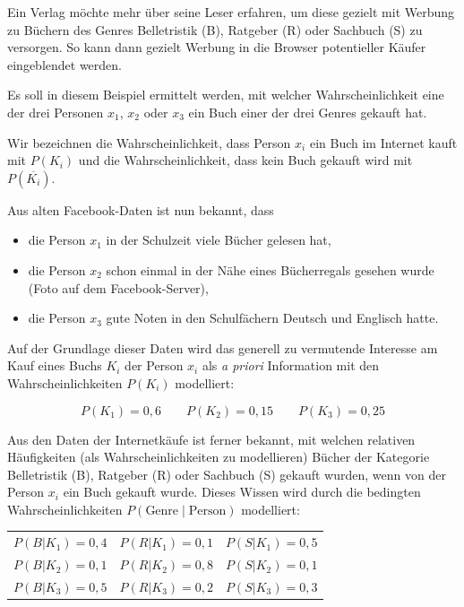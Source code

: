 \begin{beispiel}[Internetwerbung]
Ein Verlag möchte mehr über seine Leser erfahren, um diese gezielt mit Werbung zu Büchern des Genres Belletristik (B), Ratgeber (R) oder Sachbuch (S) zu versorgen. So kann dann gezielt Werbung in die Browser potentieller Käufer eingeblendet werden.

Es soll in diesem Beispiel ermittelt werden, mit welcher Wahrscheinlichkeit eine der drei Personen $x_1$, $x_2$ oder $x_3$ ein Buch einer der drei Genres gekauft hat.

Wir bezeichnen die Wahrscheinlichkeit, dass Person $x_i$ ein Buch im Internet kauft mit $P(K_i)$ und die Wahrscheinlichkeit, dass kein Buch gekauft wird mit $P(\overline{K_i})$.

Aus alten Facebook-Daten ist nun bekannt, dass

\begin{itemize}
  \item die Person $x_1$ in der Schulzeit viele Bücher gelesen hat,
  \item die Person $x_2$ schon einmal in der Nähe eines Bücherregals gesehen wurde (Foto auf dem Facebook-Server),
  \item die Person $x_3$ gute Noten in den Schulfächern Deutsch und Englisch hatte.
\end{itemize}

Auf der Grundlage dieser Daten wird das generell zu vermutende Interesse am Kauf eines Buchs $K_i$ der Person $x_i$ als \textit{a priori} Information mit den Wahrscheinlichkeiten $P(K_i)$ modelliert:

$$
P(K_1) = 0{,}6 \qquad P(K_2) = 0{,}15 \qquad P(K_3) = 0{,}25
$$

Aus den Daten der Internetkäufe ist ferner bekannt, mit welchen relativen Häufigkeiten (als Wahrscheinlichkeiten zu modellieren) Bücher der Kategorie Belletristik (B), Ratgeber (R) oder Sachbuch (S) gekauft wurden, wenn von der Person $x_i$ ein Buch gekauft wurde. Dieses Wissen wird durch die bedingten Wahrscheinlichkeiten $P(\text{Genre} \mid \text{Person})$ modelliert:

\begin{center}
\begin{tabular}{lll}
  $P(B|K_1) = 0{,}4$ & $P(R|K_1) = 0{,}1$ & $P(S|K_1) = 0{,}5$ \\
  $P(B|K_2) = 0{,}1$ & $P(R|K_2) = 0{,}8$ & $P(S|K_2) = 0{,}1$ \\
  $P(B|K_3) = 0{,}5$ & $P(R|K_3) = 0{,}2$ & $P(S|K_3) = 0{,}3$ \\
\end{tabular}
\end{center}


\end{beispiel}
